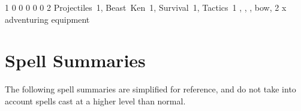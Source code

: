 {\begin{multicols}{2}

{1}%
{0}%
{{0}%
{0}%
{0}}%
{0}%
{2}%
{Projectiles~1, Beast~Ken~1, Survival~1, Tactics~1
\knacks{\mightydraw, \charge}}%
{\longsword, \partialchain, \bucklar, bow, 2 x adventuring equipment}%
{\addtocounter{fp}{5}}



\end{multicols}


}{}

\chapter{Spell Summaries}

The following spell summaries are simplified for reference, and do not take into account spells cast at a higher level than normal.

\vspace{1em}

